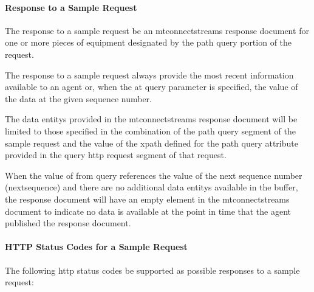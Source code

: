 \documentclass{mtconnect}	%
\begin{document}
\paragraph{Response to a Sample Request}\mbox{}

The \gls{response} to a \gls{sample request} \SHOULD be an \gls{mtconnectstreams response document} for one or more pieces of equipment designated by the \gls{path query} portion of the \gls{request}.

The \gls{response} to a \gls{sample request} \MUST always provide the most recent information available to an \gls{agent} or, when the \gls{at query} parameter is specified, the value of the data at the given \gls{sequence number}.

The \glspl{data entity} provided in the \gls{mtconnectstreams response document} will be limited to those specified in the combination of the \gls{path query} segment of the \gls{sample request} and the value of the \gls{xpath} defined for the \gls{path query} attribute provided in the \gls{query http request} segment of that \gls{request}.

When the value of \gls{from query} references the value of the next \gls{sequence number} (\gls{nextsequence}) and there are no additional \glspl{data entity} available in the buffer, the response document will have an empty  element in the \gls{mtconnectstreams} document to indicate no data is available at the point in time that the \gls{agent} published the \gls{response document}.

\paragraph{HTTP Status Codes for a Sample Request}\mbox{}

The following \glspl{http status code} \MUST be supported as possible responses to a \gls{sample request}:
\end{document}
